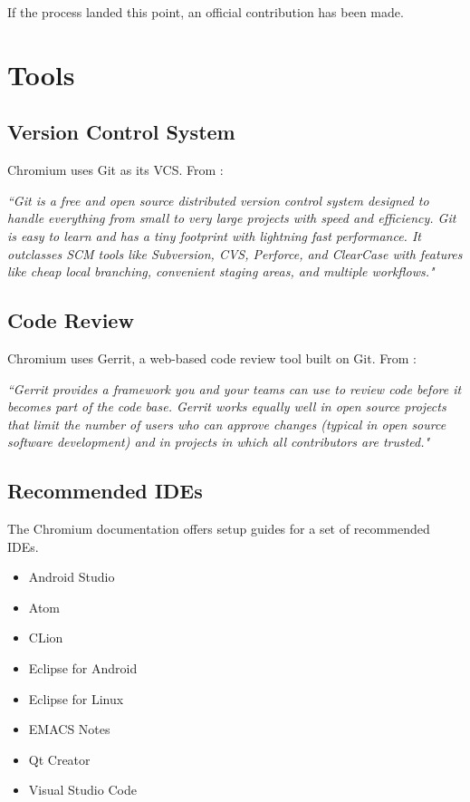 If the process landed this point, an official contribution has been made.


\section{Tools}

\subsection{Version Control System}
Chromium uses Git as its VCS. From \cite{git}: 

\textit{``Git is a free and open source distributed version control system designed to handle everything from small to very large projects with speed and efficiency.
Git is easy to learn and has a tiny footprint with lightning fast performance. It outclasses SCM tools like Subversion, CVS, Perforce, and ClearCase with features like cheap local branching, convenient staging areas, and multiple workflows."}

\subsection{Code Review}

Chromium uses Gerrit, a web-based code review tool built on Git. From \cite{gerrit}:

\textit{``Gerrit provides a framework you and your teams can use to review code before it becomes part of the code base. Gerrit works equally well in open source projects that limit the number of users who can approve changes (typical in open source software development) and in projects in which all contributors are trusted."}


\subsection{Recommended IDEs}

The Chromium documentation offers setup guides for a set of recommended IDEs.
\begin{itemize}
    \item Android Studio
    \item Atom
    \item CLion
    \item Eclipse for Android
    \item Eclipse for Linux
    \item EMACS Notes
    \item Qt Creator
    \item Visual Studio Code
\end{itemize}

